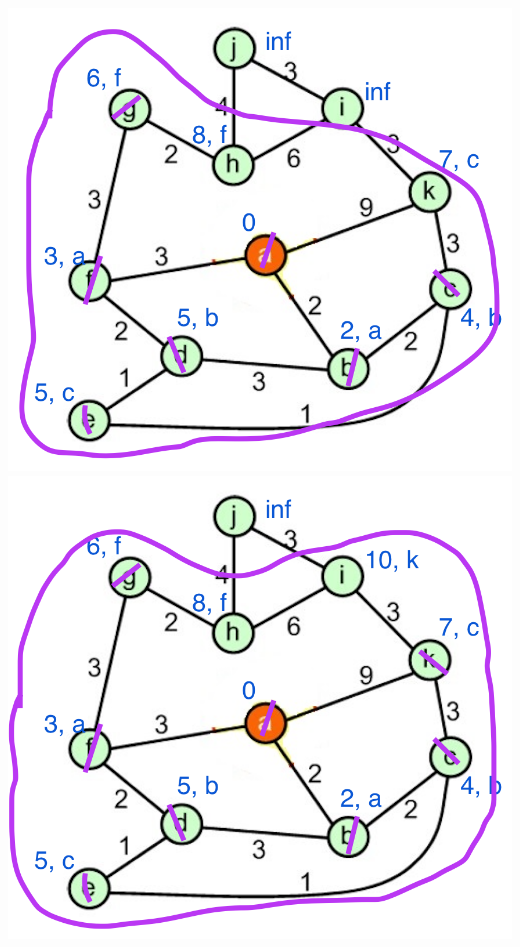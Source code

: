\documentclass[a4paper]{exam}
\begin{document}
\begin{questions}
\begin{parts}
\begin{solution}
    \includegraphics[scale=0.2]{Q3/images3g/3g7}
    \includegraphics[scale=0.2]{Q3/images3g/3g8}\\

\end{solution}
\end{parts}
\end{questions}
\end{document}
